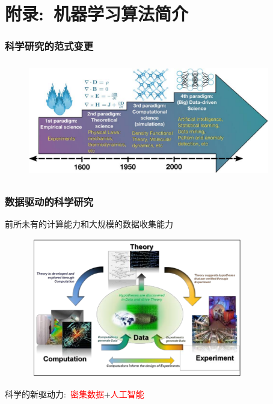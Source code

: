 \section{附录:~机器学习算法简介}
\frame
{
	\frametitle{科学研究的范式变更}
\begin{figure}[h!]
\vspace*{0.08in}
\centering
\includegraphics[height=2.00in,width=4.15in]{Figures/Four_Model_3.png}
\label{Four_Model}
\end{figure}
}

\frame
{
	\frametitle{数据驱动的科学研究}
前所未有的计算能力和大规模的数据收集能力%
\begin{figure}[h!]
\centering
\includegraphics[height=2.40in,width=3.75in]{Figures/Four_Model_1.png}
\label{Four_Model_1}
\end{figure}
科学的新驱动力:~\textcolor{red}{密集数据}+\textcolor{red}{人工智能}
}

